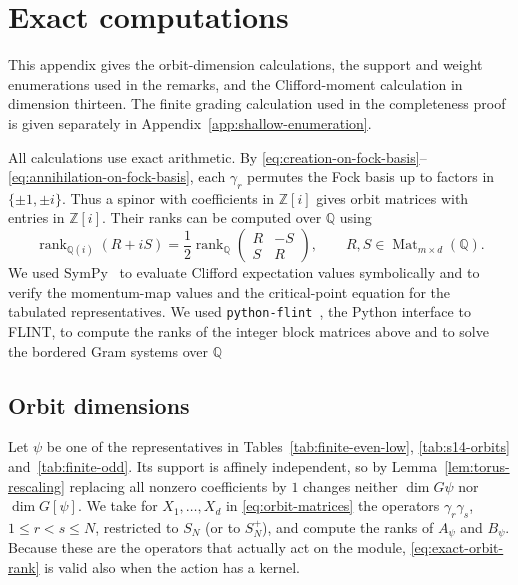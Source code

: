 \documentclass{article}
\theoremstyle{definition}
\theoremstyle{remark}
\begin{document}
\section{Exact computations}
\label{app:exact-verification}

This appendix gives the orbit-dimension calculations, the support and
weight enumerations used in the remarks, and the Clifford-moment
calculation in dimension thirteen. The finite grading calculation used
in the completeness proof is given separately in
Appendix~\ref{app:shallow-enumeration}.

All calculations use exact arithmetic. By
\eqref{eq:creation-on-fock-basis}--\eqref{eq:annihilation-on-fock-basis}, each
$\gamma_r$ permutes the Fock basis up to factors in $\{\pm1,\pm i\}$.
Thus a spinor with coefficients in $\mathbb Z[i]$ gives orbit matrices
with entries in $\mathbb Z[i]$. Their ranks can be computed over
$\mathbb Q$ using
\begin{equation}
 \operatorname{rank}_{\mathbb Q(i)}(R+iS)
 =\frac12\operatorname{rank}_{\mathbb Q}
 \begin{pmatrix}R&-S\\S&R\end{pmatrix},
 \qquad R,S\in\operatorname{Mat}_{m\times d}(\mathbb Q).
\end{equation}
We used SymPy~\cite{SymPy2017} to evaluate Clifford expectation values symbolically and to verify the momentum-map values and the critical-point equation for the tabulated representatives. We used
\texttt{python-flint}~\cite{PythonFlint}, the Python interface to FLINT, to compute the ranks of the integer block matrices above and to solve the bordered Gram systems over $\mathbb{Q}$

\subsection{Orbit dimensions}
\label{app:orbit-dimensions}

Let $\psi$ be one of the representatives in
Tables~\ref{tab:finite-even-low}, \ref{tab:s14-orbits}
and~\ref{tab:finite-odd}. Its support is affinely independent, so by
Lemma~\ref{lem:torus-rescaling} replacing all nonzero coefficients by $1$
changes neither $\dim G\psi$ nor $\dim G[\psi]$. We take for
$X_1,\ldots,X_d$ in \eqref{eq:orbit-matrices} the operators
$\gamma_r\gamma_s$, $1\le r<s\le N$, restricted to $S_N$ (or to $S_N^+$), and
compute the ranks of $A_\psi$ and $B_\psi$. Because these are the operators
that actually act on the module, \eqref{eq:exact-orbit-rank} is valid also
when the action has a kernel.
\end{document}
